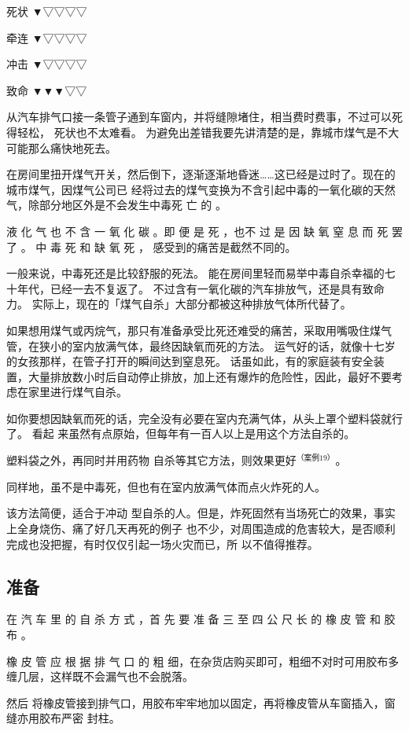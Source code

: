 \documentclass[UTF8]{ctexart}
\begin{document}
死状 ▼▽▽▽▽

牵连 ▼▽▽▽▽

冲击 ▼▽▽▽▽

致命 ▼▼▼▽▽

从汽车排气口接一条管子通到车窗内，并将缝隙堵住，相当费时费事，不过可以死得轻松， 死状也不太难看。 
为避免出差错我要先讲清楚的是，靠城市煤气是不大可能那么痛快地死去。

在房间里扭开煤气开关，然后倒下，逐渐逐渐地昏迷……这已经是过时了。现在的城市煤气，因煤气公司已 经将过去的煤气变换为不含引起中毒的一氧化碳的天然气，除部分地区外是不会发生中毒死 亡 的 。

液 化 气 也 不 含 一 氧 化 碳 。即 便 是 死 ，也不 过 是 因 缺 氧 窒 息 而 死 罢 了 。
中 毒 死 和 缺 氧 死 ， 感受到的痛苦是截然不同的。

一般来说，中毒死还是比较舒服的死法。
能在房间里轻而易举中毒自杀幸福的七十年代，已经一去不复返了。 
不过含有一氧化碳的汽车排放气，还是具有致命力。
实际上，现在的「煤气自杀」大部分都被这种排放气体所代替了。

如果想用煤气或丙烷气，那只有准备承受比死还难受的痛苦，采取用嘴吸住煤气管，在狭小的室内放满气体，最终因缺氧而死的方法。
运气好的话，就像十七岁的女孩那样，在管子打开的瞬间达到窒息死。
话虽如此，有的家庭装有安全装置，大量排放数小时后自动停止排放，加上还有爆炸的危险性，因此，最好不要考虑在家里进行煤气自杀。

如你要想因缺氧而死的话，完全没有必要在室内充满气体，从头上罩个塑料袋就行了。
看起 来虽然有点原始，但每年有一百人以上是用这个方法自杀的。

塑料袋之外，再同时并用药物 自杀等其它方法，则效果更好$^{（案例 19）}$。
 
同样地，虽不是中毒死，但也有在室内放满气体而点火炸死的人。

该方法简便，适合于冲动 型自杀的人。但是，炸死固然有当场死亡的效果，事实上全身烧伤、痛了好几天再死的例子 也不少，对周围造成的危害较大，是否顺利完成也没把握，有时仅仅引起一场火灾而已，所 以不值得推荐。

\subsection{准备}

在 汽 车 里 的 自 杀 方 式 ，首 先 要 准 备 三 至 四 公 尺 长 的 橡 皮 管 和 胶 布 。

橡 皮 管 应 根 据 排 气 口 的 粗 细，在杂货店购买即可，粗细不对时可用胶布多缠几层，这样既不会漏气也不会脱落。

然后 将橡皮管接到排气口，用胶布牢牢地加以固定，再将橡皮管从车窗插入，窗缝亦用胶布严密 封柱。
\end{document}
